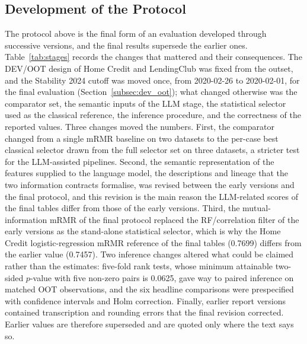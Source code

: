 \documentclass[final,5p,twocolumn]{elsarticle}
\begin{document}
\subsection{Development of the Protocol}
\label{subsec:protocol_development}

The protocol above is the final form of an evaluation developed through successive versions, and the final results supersede the earlier ones. Table~\ref{tab:stages} records the changes that mattered and their consequences. The DEV/OOT design of Home Credit and LendingClub was fixed from the outset, and the Stability 2024 cutoff was moved once, from 2020-02-26 to 2020-02-01, for the final evaluation (Section~\ref{subsec:dev_oot}); what changed otherwise was the comparator set, the semantic inputs of the LLM stage, the statistical selector used as the classical reference, the inference procedure, and the correctness of the reported values. Three changes moved the numbers. First, the comparator changed from a single mRMR baseline on two datasets to the per-case best classical selector drawn from the full selector set on three datasets, a stricter test for the LLM-assisted pipelines. Second, the semantic representation of the features supplied to the language model, the descriptions and lineage that the two information contracts formalise, was revised between the early versions and the final protocol, and this revision is the main reason the LLM-related scores of the final tables differ from those of the early versions. Third, the mutual-information mRMR of the final protocol replaced the RF/correlation filter of the early versions as the stand-alone statistical selector, which is why the Home Credit logistic-regression mRMR reference of the final tables (0.7699) differs from the earlier value (0.7457). Two inference changes altered what could be claimed rather than the estimates: five-fold rank tests, whose minimum attainable two-sided $p$-value with five non-zero pairs is 0.0625, gave way to paired inference on matched OOT observations, and the six headline comparisons were prespecified with confidence intervals and Holm correction. Finally, earlier report versions contained transcription and rounding errors that the final revision corrected. Earlier values are therefore superseded and are quoted only where the text says so.
\end{document}

